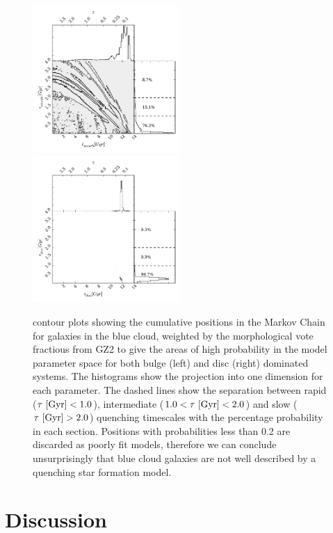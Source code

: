 \documentclass[useAMS,usenatbib]{mn2e}
\def\changed    {\color{titlecol} }
\begin{document}
\begin{figure}
\includegraphics[width=0.4975\textwidth]{blue_smooth.pdf}
\includegraphics[width=0.4975\textwidth]{blue_disc.pdf}
\caption[8pt]{{\changed contour plots showing the cumulative positions in the Markov Chain for galaxies in the blue cloud, weighted by the morphological vote fractious from GZ2 to give the areas of high probability in the model parameter space for both bulge (left) and disc (right) dominated systems. The histograms show the projection into one dimension for each parameter. The dashed lines show the separation between rapid ($\tau ~\rm{[Gyr]} < 1.0$), intermediate ($1.0 < \tau ~\rm{[Gyr]} < 2.0$) and slow ($\tau ~\rm{[Gyr]} > 2.0$) quenching timescales with the percentage probability in each section. Positions with probabilities less than 0.2 are discarded as poorly fit models, therefore we can conclude unsurprisingly that blue cloud galaxies are not well described by a quenching star formation model. }}
\label{blue_c}
\end{figure}

\section{Discussion}\label{diss}
\end{document}

